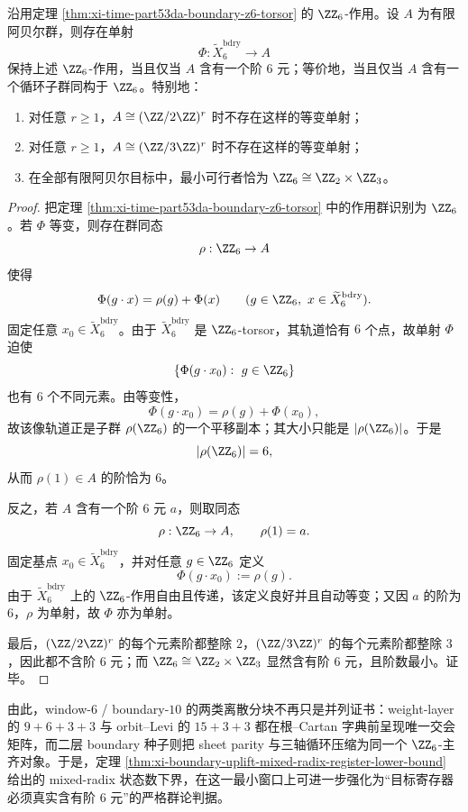 \begin{corollary}\label{cor:xi-time-part53da-equivariant-boundary-coding-order-six}
沿用定理 \ref{thm:xi-time-part53da-boundary-z6-torsor} 的 \(\ZZ_6\)-作用。设 \(A\) 为有限阿贝尔群，则存在单射
\[
\Phi:\widetilde X_6^{\mathrm{bdry}}\longrightarrow A
\]
保持上述 \(\ZZ_6\)-作用，当且仅当 \(A\) 含有一个阶 \(6\) 元；等价地，当且仅当 \(A\) 含有一个循环子群同构于 \(\ZZ_6\)。特别地：
\begin{enumerate}
  \item 对任意 \(r\ge 1\)，\(A\cong (\ZZ/2\ZZ)^r\) 时不存在这样的等变单射；
  \item 对任意 \(r\ge 1\)，\(A\cong (\ZZ/3\ZZ)^r\) 时不存在这样的等变单射；
  \item 在全部有限阿贝尔目标中，最小可行者恰为 \(\ZZ_6\cong \ZZ_2\times \ZZ_3\)。
\end{enumerate}
\end{corollary}
\begin{proof}
把定理 \ref{thm:xi-time-part53da-boundary-z6-torsor} 中的作用群识别为 \(\ZZ_6\)。若 \(\Phi\) 等变，则存在群同态
\[
\rho:\ZZ_6\to A
\]
使得
\[
\Phi(g\cdot x)=\rho(g)+\Phi(x)
\qquad
(g\in \ZZ_6,\ x\in \widetilde X_6^{\mathrm{bdry}}).
\]
固定任意 \(x_0\in \widetilde X_6^{\mathrm{bdry}}\)。由于 \(\widetilde X_6^{\mathrm{bdry}}\) 是 \(\ZZ_6\)-torsor，其轨道恰有 \(6\) 个点，故单射 \(\Phi\) 迫使
\[
\{\Phi(g\cdot x_0):\ g\in \ZZ_6\}
\]
也有 \(6\) 个不同元素。由等变性，
\[
\Phi(g\cdot x_0)=\rho(g)+\Phi(x_0),
\]
故该像轨道正是子群 \(\rho(\ZZ_6)\) 的一个平移副本；其大小只能是 \(|\rho(\ZZ_6)|\)。于是
\[
|\rho(\ZZ_6)|=6,
\]
从而 \(\rho(1)\in A\) 的阶恰为 \(6\)。

反之，若 \(A\) 含有一个阶 \(6\) 元 \(a\)，则取同态
\[
\rho:\ZZ_6\to A,\qquad \rho(1)=a.
\]
固定基点 \(x_0\in \widetilde X_6^{\mathrm{bdry}}\)，并对任意 \(g\in \ZZ_6\) 定义
\[
\Phi(g\cdot x_0):=\rho(g).
\]
由于 \(\widetilde X_6^{\mathrm{bdry}}\) 上的 \(\ZZ_6\)-作用自由且传递，该定义良好并且自动等变；又因 \(a\) 的阶为 \(6\)，\(\rho\) 为单射，故 \(\Phi\) 亦为单射。

最后，\((\ZZ/2\ZZ)^r\) 的每个元素阶都整除 \(2\)，\((\ZZ/3\ZZ)^r\) 的每个元素阶都整除 \(3\)，因此都不含阶 \(6\) 元；而 \(\ZZ_6\cong\ZZ_2\times\ZZ_3\) 显然含有阶 \(6\) 元，且阶数最小。证毕。
\end{proof}

\noindent
由此，window-\(6\) / boundary-\(10\) 的两类离散分块不再只是并列证书：weight-layer 的 \(9+6+3+3\) 与 orbit--Levi 的 \(15+3+3\) 都在根--Cartan 字典前呈现唯一交会矩阵，而二层 boundary 种子则把 sheet parity 与三轴循环压缩为同一个 \(\ZZ_6\)-主齐对象。于是，定理 \ref{thm:xi-boundary-uplift-mixed-radix-register-lower-bound} 给出的 mixed-radix 状态数下界，在这一最小窗口上可进一步强化为“目标寄存器必须真实含有阶 \(6\) 元”的严格群论判据。

\endinput
